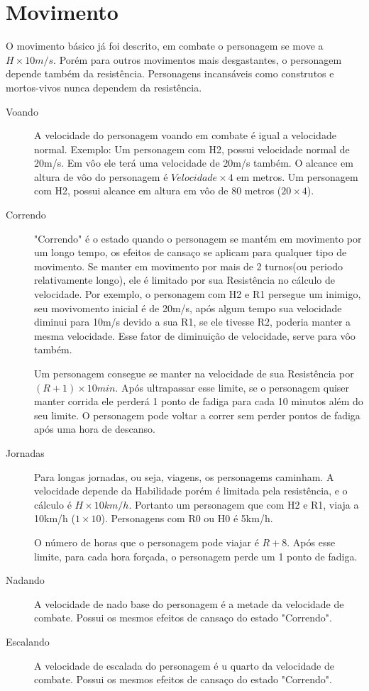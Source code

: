 \section{Movimento}
O movimento básico já foi descrito, em combate o personagem se move a \( H \times 10m/s \). Porém para outros movimentos mais desgastantes, o personagem depende também da resistência. Personagens incansáveis como construtos e mortos-vivos nunca dependem da resistência.
\begin{description}
\item[Voando] A velocidade do personagem voando em combate é igual a velocidade normal.
Exemplo: Um personagem com H2, possui velocidade normal de 20m/s. Em vôo ele terá uma velocidade de 20m/s também.
O alcance em altura de vôo do personagem é \( Velocidade \times 4 \) em metros. Um personagem com H2, possui alcance em altura em vôo de 80 metros (\( 20 \times 4 \)).
\item[Correndo]
"Correndo" é o estado quando o personagem se mantém em movimento por um longo tempo, os efeitos de cansaço se aplicam para qualquer tipo de movimento. Se manter em movimento por mais de 2 turnos(ou periodo relativamente longo), ele é limitado por sua Resistência no cálculo de velocidade. Por exemplo, o personagem com H2 e R1 persegue um inimigo, seu movivomento inicial é de 20m/s, após algum tempo sua velocidade diminui para 10m/s devido a sua R1, se ele tivesse R2, poderia manter a mesma velocidade. Esse fator de diminuição de velocidade, serve para vôo também.

Um personagem consegue se manter na velocidade de sua Resistência por \( (R+1) \times 10min \). Após ultrapassar esse limite, se o personagem quiser manter corrida ele perderá 1 ponto de fadiga para cada 10 minutos além do seu limite. O personagem pode voltar a correr sem perder pontos de fadiga após uma hora de descanso.

\item[Jornadas] Para longas jornadas, ou seja, viagens, os personagems caminham. A velocidade depende da Habilidade porém é limitada pela resistência, e o cálculo é \( H \times 10km/h \). Portanto um personagem que com H2 e R1, viaja a 10km/h (\( 1 \times 10 \)). Personagens com R0 ou H0 é 5km/h.

O número de horas que o personagem pode viajar é \( R + 8 \). Após esse limite, para cada hora forçada, o personagem perde um 1 ponto de fadiga. 

\item[Nadando] A velocidade de nado base do personagem é a metade da velocidade de combate. Possui os mesmos efeitos de cansaço do estado "Correndo".
\item[Escalando] A velocidade de escalada do personagem é u quarto da velocidade de combate. Possui os mesmos efeitos de cansaço do estado "Correndo".
\end{description}

